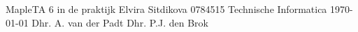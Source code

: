 \documentclass[12pt,a4paper,dutch]{report}
\newif\ifpublic
\begin{document}

\titelblad
  {MapleTA 6 in de praktijk} %
  {Elvira Sitdikova}        %
  {0784515}                 %
  {Technische Informatica} %
  {\today}                 %
  {Dhr. A. van der Padt}         %
  {Dhr. P.J. den Brok}           %
\ifpublic
s  {\footnotesize{\textsf{}}}
\else
  
  
  
\fi
\ifpublic
  \def\bibname{\normalsize{Bronnen}}
\else
  \def\bibname{Bronnen}
  \appendix{}
\fi
\end{document}
